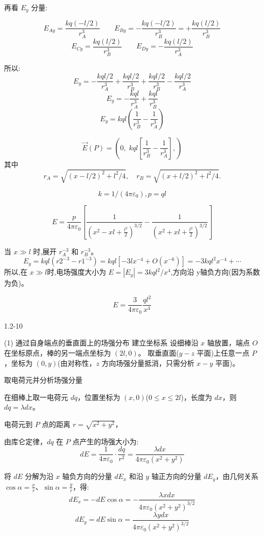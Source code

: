 \documentclass{article}
\begin{document}
再看 $ E_y $ 分量:

$$E_{Ay} = \frac{k q (-l/2)}{r_A^3}\qquad E_{By} = -\frac{k q (-l/2)}{r_B^3} = +\frac{k q (l/2)}{r_B^3}$$
$$E_{Cy} = \frac{k q (l/2)}{r_B^3}\qquad E_{Dy} = -\frac{k q (l/2)}{r_A^3}$$

所以:
$$E_y = -\frac{k q l/2}{r_A^3} + \frac{k q l/2}{r_B^3} + \frac{k q l/2}{r_B^3} - \frac{k q l/2}{r_A^3}$$
$$E_y = - \frac{k q l}{r_A^3} + \frac{k q l}{r_B^3}$$
$$E_y = k q l \left( \frac{1}{r_B^3} - \frac{1}{r_A^3} \right)$$

$$\vec{E}(P) = \left( 0, \; k q l \left[ \frac{1}{r_B^3} - \frac{1}{r_A^3} \right],\right)$$
其中
$$r_A = \sqrt{(x - l/2)^2 + l^2/4}, \quad r_B = \sqrt{(x + l/2)^2 + l^2/4}.$$

$$k =1/(4\pi\varepsilon_0),p=ql$$

$$E=\frac{p}{4\pi\varepsilon_0}[\frac{1}{\left(x^2-xl+\frac{l^2}{2}\right)^{3/2}}-\frac{1}{\left(x^2+xl+\frac{l^2}{2}\right)^{3/2}}]$$

当 $ x \gg l $ 时,展开 $ r_A^{-3} $ 和 $ r_B^{-3} $。
$$E_y = k q l (r2^{-3} - r1^{-3}) = k q l [ -3l x^{-4} + O(x^{-6}) ] = -3 k q l^2 x^{-4} + \cdots$$
所以,在 $x\gg l$时,电场强度大小为 $E = |E_y| =3 k q l^2 / x^4$,方向沿 y轴负方向(因为系数为负)。

$$E = \frac{3}{4\pi\varepsilon_0} \frac{q l^2}{x^4}$$





\newpage

1.2-10



 (1)  通过自身端点的垂直面上的场强分布
建立坐标系
设细棒沿 $ x $ 轴放置，端点 $ O $ 在坐标原点，棒的另一端点坐标为 $ (2l, 0) $。
取垂直面($ y-z $ 平面)上任意一点 $ P $，坐标为 $ (0, y) $(由对称性，$ z $ 方向场强分量抵消，只需分析 $ x-y $ 平面)。

取电荷元并分析场强分量

在细棒上取一电荷元 $ dq $，位置坐标为 $ (x, 0) $($ 0\le x\le 2l $)，长度为 $ dx $，则 $ dq = \lambda dx $。

电荷元到 $ P $ 点的距离 $ r = \sqrt{x^2+y^2} $，

由库仑定律，$ dq $ 在 $ P $ 点产生的场强大小为:
$$dE = \frac{1}{4\pi\varepsilon_0} \cdot \frac{dq}{r^2} = \frac{\lambda dx}{4\pi\varepsilon_0(x^2+y^2)}$$

将 $ dE $ 分解为沿 $ x $ 轴负方向的分量 $ dE_x $ 和沿 $ y $ 轴正方向的分量 $ dE_y $，由几何关系 $ \cos\alpha = \frac{x}{r} $、$ \sin\alpha = \frac{y}{r} $，得:
$$dE_x=-dE\cos\alpha=-\frac{\lambda xdx}{4\pi\varepsilon_0(x^2+y^2)^{3/2}}$$
$$dE_y=dE\sin\alpha=\frac{\lambda ydx}{4\pi\varepsilon_0(x^2+y^2)^{3/2}}$$
\end{document}
